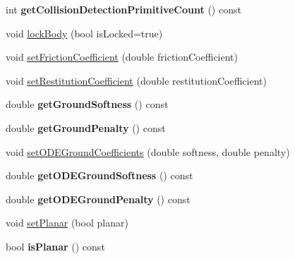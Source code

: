 \begin{DoxyCompactItemize}
\item 
\hypertarget{classCartWheel_1_1Physics_1_1RigidBody_a3ce2aad6a34c5588d97d0ccddff78120}{
int {\bfseries getCollisionDetectionPrimitiveCount} () const }
\label{classCartWheel_1_1Physics_1_1RigidBody_a3ce2aad6a34c5588d97d0ccddff78120}

\item 
void \hyperlink{classCartWheel_1_1Physics_1_1RigidBody_a7b491a48c13693d6839c6b6f3e9f6dda}{lockBody} (bool isLocked=true)
\item 
void \hyperlink{classCartWheel_1_1Physics_1_1RigidBody_a325cb4000d1c8f03b1dac250848e657c}{setFrictionCoefficient} (double frictionCoefficient)
\item 
void \hyperlink{classCartWheel_1_1Physics_1_1RigidBody_a4c009a35d7cf76651c8a890b8c1d4d37}{setRestitutionCoefficient} (double restitutionCoefficient)
\item 
\hypertarget{classCartWheel_1_1Physics_1_1RigidBody_a135897fb6aa42dd9e34affbf943e9a92}{
double {\bfseries getGroundSoftness} () const }
\label{classCartWheel_1_1Physics_1_1RigidBody_a135897fb6aa42dd9e34affbf943e9a92}

\item 
\hypertarget{classCartWheel_1_1Physics_1_1RigidBody_a4fa6290bff3f94b815a0e361f714144d}{
double {\bfseries getGroundPenalty} () const }
\label{classCartWheel_1_1Physics_1_1RigidBody_a4fa6290bff3f94b815a0e361f714144d}

\item 
void \hyperlink{classCartWheel_1_1Physics_1_1RigidBody_a9cb0889861eb744225cde11a3e972c6b}{setODEGroundCoefficients} (double softness, double penalty)
\item 
\hypertarget{classCartWheel_1_1Physics_1_1RigidBody_a340fad577816c736f4fa3c1fdaa35236}{
double {\bfseries getODEGroundSoftness} () const }
\label{classCartWheel_1_1Physics_1_1RigidBody_a340fad577816c736f4fa3c1fdaa35236}

\item 
\hypertarget{classCartWheel_1_1Physics_1_1RigidBody_ad223429decc8768dffd391f10535507a}{
double {\bfseries getODEGroundPenalty} () const }
\label{classCartWheel_1_1Physics_1_1RigidBody_ad223429decc8768dffd391f10535507a}

\item 
void \hyperlink{classCartWheel_1_1Physics_1_1RigidBody_a88ef149632bdebc1d5e7f484a41cf4c6}{setPlanar} (bool planar)
\item 
\hypertarget{classCartWheel_1_1Physics_1_1RigidBody_af5560bb06685e71bc960705d87194f30}{
bool {\bfseries isPlanar} () const }
\label{classCartWheel_1_1Physics_1_1RigidBody_af5560bb06685e71bc960705d87194f30}


\end{DoxyCompactItemize}
